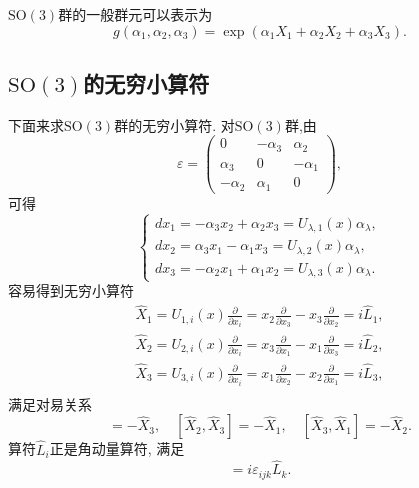 \documentclass[UTF8]{ctexart}
\begin{document}
$\mathrm{SO}(3)$群的一般群元可以表示为
\begin{equation}
  g(\alpha_1, \alpha_2, \alpha_3) = \exp (\alpha_1 X_1 + \alpha_2 X_2 + \alpha_3 X_3).
\end{equation}

\subsection{$\mathrm{SO}(3)$的无穷小算符}
下面来求$\mathrm{SO}(3)$群的无穷小算符. 对$\mathrm{SO}(3)$群,由
\begin{equation}
  \varepsilon =
  \begin{pmatrix}
    0 & -\alpha_3 & \alpha_2 \\
    \alpha_3 & 0 & -\alpha_1 \\
    -\alpha_2 & \alpha_1 & 0
  \end{pmatrix},
\end{equation}
可得
\begin{equation}
  \begin{cases}
    dx_1 = -\alpha_3x_2 + \alpha_2x_3 = U_{\lambda,1}(x)\alpha_\lambda, \\
    dx_2 = \alpha_3x_1 - \alpha_1x_3 = U_{\lambda,2}(x)\alpha_\lambda, \\
    dx_3 = -\alpha_2x_1 + \alpha_1x_2 = U_{\lambda,3}(x)\alpha_\lambda.
  \end{cases}
\end{equation}
容易得到无穷小算符
\begin{gather}
  \hat{X}_1 = U_{1,i}(x)\frac{\partial}{\partial x_i} = x_2 \frac{\partial}{\partial x_3} - x_3 \frac{\partial}{\partial x_2} = i \hat{L}_1, \\
  \hat{X}_2 = U_{2,i}(x)\frac{\partial}{\partial x_i} = x_3 \frac{\partial}{\partial x_1} - x_1 \frac{\partial}{\partial x_3} = i \hat{L}_2, \\
  \hat{X}_3 = U_{3,i}(x)\frac{\partial}{\partial x_i} = x_1 \frac{\partial}{\partial x_2} - x_2 \frac{\partial}{\partial x_1} = i \hat{L}_3, \\
\end{gather}
满足对易关系
\begin{equation}
  [\hat{X}_1, \hat{X}_2] = -\hat{X}_3, \quad[\hat{X}_2, \hat{X}_3] = -\hat{X}_1, \quad[\hat{X}_3, \hat{X}_1] = -\hat{X}_2.
\end{equation}
算符$\hat{L}_i$正是角动量算符, 满足
\begin{equation}
  [\hat{L}_i,\hat{L}_j] = i \varepsilon_{ijk}\hat{L}_k.
\end{equation}
\end{document}
